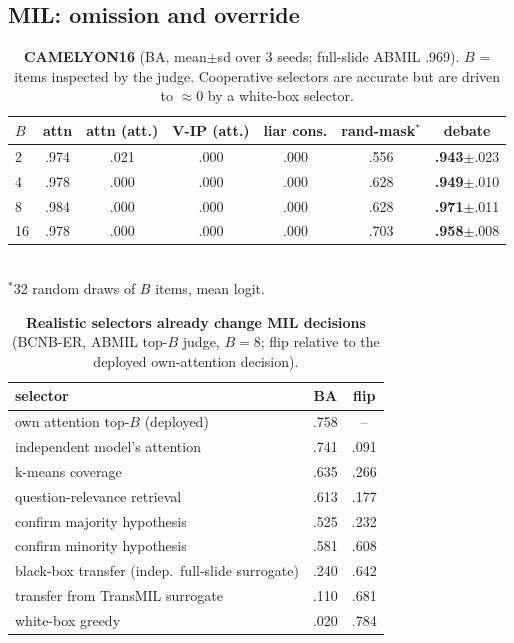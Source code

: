 \documentclass[10pt,twocolumn,letterpaper]{article}
\begin{document}
\subsection{MIL: omission and override}
\begin{table}[t]\centering\small
\caption{\textbf{CAMELYON16} (BA, mean$\pm$sd over 3 seeds; full-slide ABMIL .969). $B$ = items inspected by the judge. Cooperative selectors are accurate but are driven to $\approx$0 by a white-box selector.}\label{tab:c16}
\setlength{\tabcolsep}{3pt}
\begin{tabular}{@{}lcccccc@{}}\toprule
$B$ & attn & attn (att.) & V-IP (att.) & liar cons. & rand-mask$^\ast$ & debate\\\midrule
2  & .974 & .021 & .000 & .000 & .556 & \textbf{.943}$\pm$.023\\
4  & .978 & .000 & .000 & .000 & .628 & \textbf{.949}$\pm$.010\\
8  & .984 & .000 & .000 & .000 & .628 & \textbf{.971}$\pm$.011\\
16 & .978 & .000 & .000 & .000 & .703 & \textbf{.958}$\pm$.008\\\bottomrule
\end{tabular}\\[1pt]{\footnotesize $^\ast$32 random draws of $B$ items, mean logit.}
\end{table}

\begin{table}[t]\centering\small
\caption{\textbf{Realistic selectors already change MIL decisions} (BCNB-ER, ABMIL top-$B$ judge, $B{=}8$; flip relative to the deployed own-attention decision).}\label{tab:natural}
\begin{tabular}{@{}lcc@{}}\toprule
selector & BA & flip\\\midrule
own attention top-$B$ (deployed) & .758 & --\\
independent model's attention & .741 & .091\\
k-means coverage & .635 & .266\\
question-relevance retrieval & .613 & .177\\
confirm majority hypothesis & .525 & .232\\
confirm minority hypothesis & .581 & .608\\\midrule
black-box transfer (indep.\ full-slide surrogate) & .240 & .642\\
transfer from TransMIL surrogate & .110 & .681\\
white-box greedy & .020 & .784\\\bottomrule
\end{tabular}\end{table}
\end{document}
